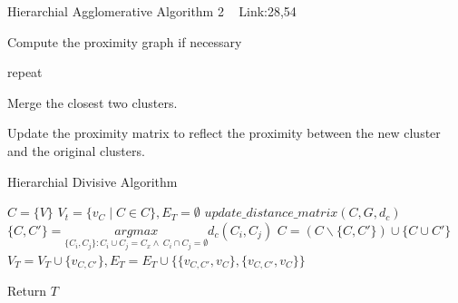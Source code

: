 \documentclass[a4paper]{article}
\begin{document}
\begin{algorithm}
   \caption{Hierarchial Agglomerative Algorithm 2 ~\cite{hierarchical1} Link:28,54}
    \begin{algorithmic}[1]
    
       
       
    \State Compute the proximity graph if necessary
    
    \State repeat
    
    \State Merge the closest two clusters.
    
    \State Update the proximity matrix to reflect the proximity between the new cluster and the original
clusters.

 \EndWhile



    
    
    

\end{algorithmic}
\end{algorithm}



  \begin{algorithm}
   \caption{Hierarchial Divisive Algorithm ~\cite{hda1}}
    \begin{algorithmic}[1]
     \State $C = \{ V\} $ 
     \State $V_t = \{v_C\mid C \in C\},E_T = \emptyset$ 
     \State $update\_distance\_matrix(C,G,d_c)$
     \State $\{C,C'\} =  \underset{\{C_i,C_j\}  : C_i \cup C_j = C_x   \wedge \  C_i \cap C_j = \emptyset}{argmax} d_c (C_i,C_j)$
     \State $C = (C \backslash \{C,C'\}) \cup \{C \cup C'\}$ 
     \State $V_T = V_T \cup \{v_{C,C'}\},E_T = E_T \cup \{\{v_{C,C'} ,v_{C}\},\{v_{C,C'} ,v_{C}\}\}$ 
     \EndWhile
    
      
        
       
       \State Return $T$



 

\end{algorithmic}
\end{algorithm}
\end{document}
